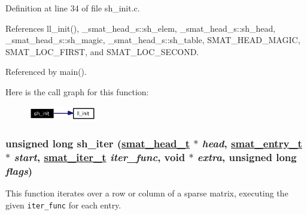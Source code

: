Definition at line 34 of file sh\_\-init.c.

References ll\_\-init(), \_\-smat\_\-head\_\-s::sh\_\-elem, \_\-smat\_\-head\_\-s::sh\_\-head, \_\-smat\_\-head\_\-s::sh\_\-magic, \_\-smat\_\-head\_\-s::sh\_\-table, SMAT\_\-HEAD\_\-MAGIC, SMAT\_\-LOC\_\-FIRST, and SMAT\_\-LOC\_\-SECOND.

Referenced by main().

Here is the call graph for this function:\begin{figure}[H]
\begin{center}
\leavevmode
\includegraphics[width=83pt]{group__dbprim__smat_ga20_cgraph}
\end{center}
\end{figure}
\hypertarget{group__dbprim__smat_ga23}{
\subsubsection[sh\_\-iter]{\setlength{\rightskip}{0pt plus 5cm}unsigned long sh\_\-iter (\hyperlink{struct__smat__head__s}{smat\_\-head\_\-t} $\ast$ {\em head}, \hyperlink{struct__smat__entry__s}{smat\_\-entry\_\-t} $\ast$ {\em start}, \hyperlink{group__dbprim__smat_ga4}{smat\_\-iter\_\-t} {\em iter\_\-func}, void $\ast$ {\em extra}, unsigned long {\em flags})}}
\label{group__dbprim__smat_ga23}


This function iterates over a row or column of a sparse matrix, executing the given {\tt iter\_\-func} for each entry.

